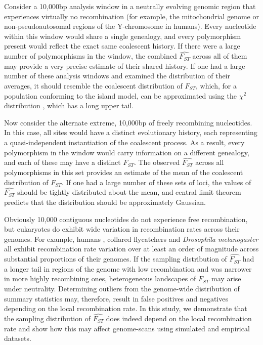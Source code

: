 \documentclass[9pt,twocolumn,twoside]{pnas-new}
\begin{document}
Consider a 10,000bp analysis window in a neutrally evolving genomic region that experiences virtually no recombination (for example, the mitochondrial genome or non-pseudoautosomal regions of the Y-chromosome in humans). Every nucleotide within this window would share a single genealogy, and every polymorphism present would reflect the exact same coalescent history. If there were a large number of polymorphisms in the window, the combined $\hat{F_{ST}}$ across all of them may provide a very precise estimate of their shared history. If one had a large number of these analysis windows and examined the distribution of their averages, it should resemble the coalescent distribution of $F_{ST}$, which, for a population conforming to the island model, can be approximated using the $\chi^2$ distribution \citep{Lewontin1973-uf}, which has a long upper tail.

Now consider the alternate extreme, 10,000bp of freely recombining nucleotides. In this case, all sites would have a distinct evolutionary history, each representing a quasi-independent instantiation of the coalescent process. As a result, every polymorphism in the window would carry information on a different genealogy, and each of these may have a distinct $F_{ST}$. The observed $\hat{F_{ST}}$ across all polymorphisms in this set provides an estimate of the mean of the coalescent distribution of $F_{ST}$. If one had a large number of these sets of loci, the values of $\hat{F_{ST}}$ should be tightly distributed about the mean, and central limit theorem predicts that the distribution should be approximately Gaussian. 


Obviously 10,000 contiguous nucleotides do not experience free recombination, but eukaryotes do exhibit wide variation in recombination rates across their genomes. For example, humans \cite{Kong2010}, collared flycatchers \cite{Kawakami2014} and \textit{Drosophila melanogaster} \citep{Comeron2012} all exhibit recombination rate variation over at least an order of magnitude across substantial proportions of their genomes. If the sampling distribution of $\hat{F_{ST}}$ had a longer tail in regions of the genome with low recombination and was narrower in more highly recombining ones, heterogeneous landscapes of $F_{ST}$ may arise under neutrality. Determining outliers from the genome-wide distribution of summary statistics may, therefore, result in false positives and negatives depending on the local recombination rate. In this study, we demonstrate that the sampling distribution of $\hat{F_{ST}}$ does indeed depend on the local recombination rate and show how this may affect genome-scans using simulated and empirical datasets.
\end{document}

